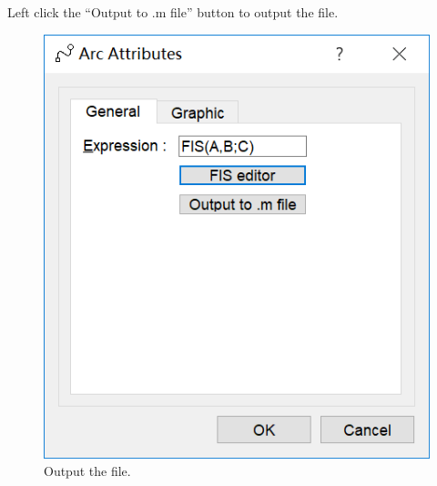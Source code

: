 \documentclass[journal,a4paper,onecolumn]{article}
\begin{document}
Left click the ``Output to .m file'' button to output the file.
\begin{figure}[!hbt]
	\begin{center}
		\includegraphics[width=\columnwidth]{fig61}
		\caption{Output the file.}
		\label{fig:Output the file.}
	\end{center}
\end{figure}
\end{document}
